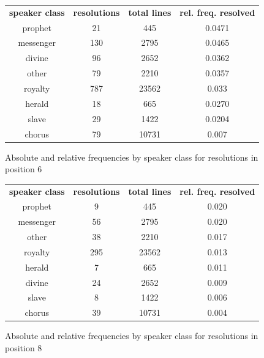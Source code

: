 \begin{figure}
\caption{Absolute and relative frequencies by speaker class for resolutions in position 6}
\begin{center}
\begin{tabular}{c | c | c | c}
\textbf{speaker class} & \textbf{resolutions} & \textbf{total lines} & \textbf{rel. freq. resolved} \\
prophet & 21 & 445 & 0.0471 \\
messenger & 130 & 2795 & 0.0465 \\
divine & 96 & 2652 & 0.0362 \\
other & 79 & 2210 & 0.0357 \\
royalty & 787 & 23562 & 0.033 \\
herald & 18 & 665 & 0.0270 \\
slave & 29 & 1422 & 0.0204 \\
chorus & 79 & 10731 & 0.007
\end{tabular}
\end{center}
\end{figure}


\begin{figure}
\caption{Absolute and relative frequencies by speaker class for resolutions in position 8}
\begin{center}
\begin{tabular}{c | c | c | c}
\textbf{speaker class} & \textbf{resolutions} & \textbf{total lines} & \textbf{rel. freq. resolved} \\
prophet & 9 & 445 & 0.020 \\
messenger & 56 & 2795 & 0.020 \\
other & 38 & 2210 & 0.017 \\
royalty & 295 & 23562 & 0.013 \\
herald & 7 & 665 & 0.011 \\
divine & 24 & 2652 & 0.009 \\
slave & 8 & 1422 & 0.006 \\
chorus & 39 & 10731 & 0.004
\end{tabular}
\end{center}
\end{figure}

